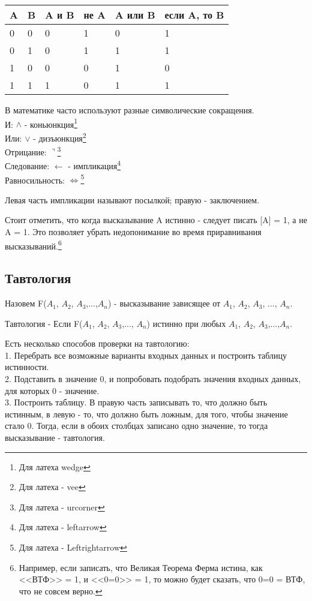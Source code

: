 \documentclass[a4paper,12pt]{article}
\begin{document}
\begin{tabular}{||l | l | l | l | l | l||}
\hline
A & B & A и B & не A & A или B & если A, то B\\
\hline
\hline
0 & 0 & 	0 & 1 & 0 & 1\\
\hline
0 & 1 & 0 & 1 & 1 & 1\\
\hline
1 & 0 & 0 & 0 & 1 & 0\\
\hline
1 & 1 & 1 & 0 & 1 & 1\\
\hline
\end{tabular}

В математике часто используют разные символические сокращения. \\
И: $\wedge$ - коньюнкция\footnote{Для латеха wedge}\\
Или: $\vee$ - дизъюнкция\footnote{Для латеха - vee}\\
Отрицание: $\urcorner$\footnote{Для латеха - urcorner}\\
Следование: $\leftarrow$ - импликация\footnote{Для латеха - leftarrow}\\
Равносильность: $\Leftrightarrow$\footnote{Для латеха - Leftrightarrow}

Левая часть импликации называют посылкой; правую - заключением.

Стоит отметить, что когда высказывание A истинно - следует писать [A] = 1, а не A = 1. Это позволяет убрать недопонимание во время приравнивания высказываний.\footnote{Например, если записать, что Великая Теорема Ферма истина, как <<ВТФ>> = 1, и <<0=0>> = 1, то можно будет сказать, что 0=0 = ВТФ, что не совсем верно.}

\subsection{Тавтология}
Назовем F($A_1$, $A_2$, $A_3$,...,$A_n$) - высказывание зависящее от $A_1$, $A_2$, $A_3$, ..., $A_n$. 

Тавтология - Если F($A_1$, $A_2$, $A_3$,..., $A_n$) истинно при любых $A_1$, $A_2$, $A_3$,...,$A_n$. 

Есть несколько способов проверки на тавтологию:\\
1. Перебрать все возможные варианты входных данных и построить таблицу истинности.\\
2. Подставить в значение 0, и попробовать подобрать значения входных данных, для которых 0 - значение.\\
3. Построить таблицу. В правую часть записывать то, что должно быть истинным, в левую - то, что должно быть ложным, для того, чтобы значение стало 0. Тогда, если в обоих столбцах записано одно значение, то тогда высказывание - тавтология.
\end{document}
